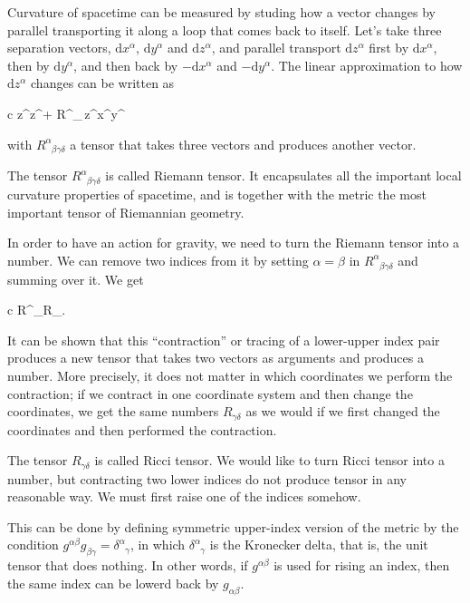 \documentclass[11pt,oneside%
]{memoir}
\newenvironment{eqna}{\begin{IEEEeqnarray*}{c}}{\end{IEEEeqnarray*}\ignorespacesafterend}
\newcommand{\dd}{\mathrm{d}}
\begin{document}
Curvature of spacetime can be measured by studing how a vector changes by parallel transporting it along a loop that comes back to itself. Let's take three separation vectors, \(\dd x^\alpha\), \(\dd y^\alpha\) and \(\dd z^\alpha\), and parallel transport \(\dd z^\alpha\) first by \(\dd x^\alpha\), then by \(\dd y^\alpha\), and then back by \(-\dd x^\alpha\) and \(-\dd y^\alpha\). The linear approximation to how \(\dd z^\alpha\) changes can be written as
\begin{eqna}
\dd z^\alpha\rightarrow\dd z^\alpha + R^\alpha_{\phantom{\alpha}\beta\gamma\delta}\,\dd z^\beta\dd x^\gamma\dd y^\delta
\end{eqna}
with \(R^\alpha_{\phantom{\alpha}\beta\gamma\delta}\) a tensor that takes three vectors and produces another vector.

The tensor \(R^\alpha_{\phantom{\alpha}\beta\gamma\delta}\) is called Riemann tensor. It encapsulates all the important local curvature properties of spacetime, and is together with the metric the most important tensor of Riemannian geometry.

In order to have an action for gravity, we need to turn the Riemann tensor into a number. We can remove two indices from it by setting \(\alpha=\beta\) in \(R^\alpha_{\phantom{\alpha}\beta\gamma\delta}\) and summing over it. We get
\begin{eqna}
R^\beta_{\phantom{\beta}\beta\gamma\delta}\doteq R_{\gamma\delta}.
\end{eqna}
It can be shown that this ``contraction'' or tracing of a lower-upper index pair produces a new tensor that takes two vectors as arguments and produces a number. More precisely, it does not matter in which coordinates we perform the contraction; if we contract in one coordinate system and then change the coordinates, we get the same numbers \(R_{\gamma\delta}\) as we would if we first changed the coordinates and then performed the contraction.

The tensor \(R_{\gamma\delta}\) is called Ricci tensor. We would like to turn Ricci tensor into a number, but contracting two lower indices do not produce tensor in any reasonable way. We must first raise one of the indices somehow.

This can be done by defining symmetric upper-index version of the metric by the condition \(g^{\alpha\beta}g_{\beta\gamma}=\delta^{\alpha}_{\phantom{\alpha}\gamma}\), in which \(\delta^{\alpha}_{\phantom{\alpha}\gamma}\) is the Kronecker delta, that is, the unit tensor that does nothing. In other words, if \(g^{\alpha\beta}\) is used for rising an index, then the same index can be lowerd back by \(g_{\alpha\beta}\).
\end{document}
